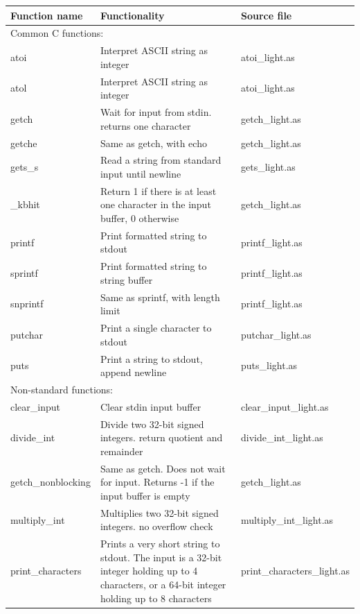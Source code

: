 \documentclass[11pt,a4paper,oneside,openright]{report}
\begin{document}
\begin{tabular}{|p{25mm}|p{100mm}|p{30mm}|} 
\hline
\bfseries Function name & \bfseries Functionality & \bfseries Source file \\ \hline
\multicolumn{3}{|l|}{Common C functions:} \\ \hline
atoi   & Interpret ASCII string as integer & atoi\_light.as  \\ \hline
atol   & Interpret ASCII string as integer & atoi\_light.as  \\ \hline
getch  & Wait for input from stdin. returns one character & getch\_light.as \\ \hline
getche  & Same as getch, with echo & getch\_light.as \\ \hline
gets\_s  & Read a string from standard input until newline & gets\_light.as \\ \hline
\_kbhit & Return 1 if there is at least one character in the input buffer, 0 otherwise & getch\_light.as \\ \hline
printf  & Print formatted string to stdout & printf\_light.as \\ \hline
sprintf  & Print formatted string to string buffer & printf\_light.as \\ \hline
snprintf  & Same as sprintf, with length limit & printf\_light.as \\ \hline
putchar    & Print a single character to stdout & putchar\_light.as \\ \hline
puts   & Print a string to stdout, append newline & puts\_light.as \\ \hline

\multicolumn{3}{|l|}{Non-standard functions:} \\ \hline

clear\_input  & Clear stdin input buffer & clear\_input\_light.as \\ \hline

divide\_int & Divide two 32-bit signed integers. return quotient and remainder & divide\_int\_light.as \\ \hline

getch\_nonblocking & Same as getch. Does not wait for input. Returns -1 if the input buffer is empty & getch\_light.as \\ \hline

multiply\_int  & Multiplies two 32-bit signed integers. no overflow check & multiply\_int\_light.as \\ \hline

print\_characters  & Prints a very short string to stdout. The input is a 32-bit integer holding up to 4 characters, or a 64-bit integer holding up to 8 characters & print\_characters\_light.as \\ \hline


\end{tabular}
\end{document}
